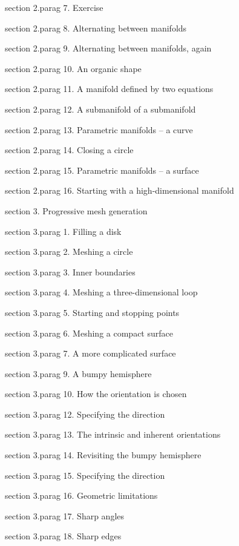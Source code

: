 \numb section 2.\numb parag 7. Exercise

\numb section 2.\numb parag 8. Alternating between manifolds

\numb section 2.\numb parag 9. Alternating between manifolds, again

\numb section 2.\numb parag 10. An organic shape

\numb section 2.\numb parag 11. A manifold defined by two equations

\numb section 2.\numb parag 12. A submanifold of a submanifold

\numb section 2.\numb parag 13. Parametric manifolds -- a curve

\numb section 2.\numb parag 14. Closing a circle

\numb section 2.\numb parag 15. Parametric manifolds -- a surface

\numb section 2.\numb parag 16. Starting with a high-dimensional manifold


\medskip\noindent
\numb section 3. Progressive mesh generation

\numb section 3.\numb parag 1. Filling a disk

\numb section 3.\numb parag 2. Meshing a circle

\numb section 3.\numb parag 3. Inner boundaries

\numb section 3.\numb parag 4. Meshing a three-dimensional loop

\numb section 3.\numb parag 5. Starting and stopping points

\numb section 3.\numb parag 6. Meshing a compact surface

\numb section 3.\numb parag 7. A more complicated surface

\numb section 3.\numb parag 9. A bumpy hemisphere

\numb section 3.\numb parag 10. How the orientation is chosen

\numb section 3.\numb parag 12. Specifying the direction

\numb section 3.\numb parag 13. The intrinsic and inherent orientations

\numb section 3.\numb parag 14. Revisiting the bumpy hemisphere

\numb section 3.\numb parag 15. Specifying the direction

\numb section 3.\numb parag 16. Geometric limitations

\numb section 3.\numb parag 17. Sharp angles

\numb section 3.\numb parag 18. Sharp edges

